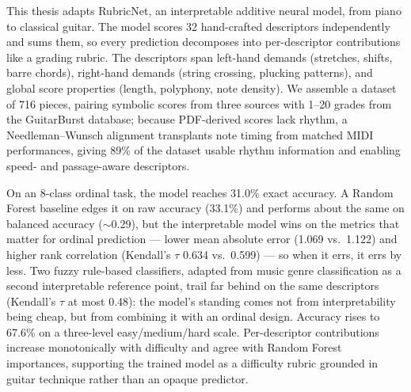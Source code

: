 \documentclass[12pt,oneside]{report}
\renewcommand{\_}{\textunderscore\allowbreak}
\begin{document}
This thesis adapts RubricNet, an interpretable additive neural model, from piano to classical guitar. The model scores 32 hand-crafted descriptors independently and sums them, so every prediction decomposes into per-descriptor contributions like a grading rubric. The descriptors span left-hand demands (stretches, shifts, barre chords), right-hand demands (string crossing, plucking patterns), and global score properties (length, polyphony, note density). We assemble a dataset of 716 pieces, pairing symbolic scores from three sources with 1--20 grades from the GuitarBurst database; because PDF-derived scores lack rhythm, a Needleman--Wunsch alignment transplants note timing from matched MIDI performances, giving 89\% of the dataset usable rhythm information and enabling speed- and passage-aware descriptors.

On an 8-class ordinal task, the model reaches 31.0\% exact accuracy. A Random Forest baseline edges it on raw accuracy (33.1\%) and performs about the same on balanced accuracy ($\sim$0.29), but the interpretable model wins on the metrics that matter for ordinal prediction --- lower mean absolute error (1.069 vs.\ 1.122) and higher rank correlation (Kendall's $\tau$ 0.634 vs.\ 0.599) --- so when it errs, it errs by less. Two fuzzy rule-based classifiers, adapted from music genre classification as a second interpretable reference point, trail far behind on the same descriptors (Kendall's $\tau$ at most 0.48): the model's standing comes not from interpretability being cheap, but from combining it with an ordinal design. Accuracy rises to 67.6\% on a three-level easy/medium/hard scale. Per-descriptor contributions increase monotonically with difficulty and agree with Random Forest importances, supporting the trained model as a difficulty rubric grounded in guitar technique rather than an opaque predictor.

\newpage

\tableofcontents
\listoffigures
\listoftables

\newpage












\end{document}
